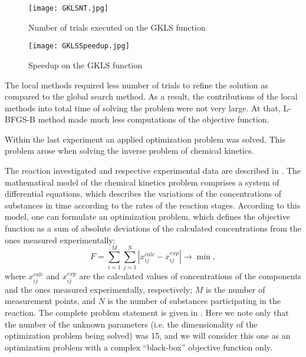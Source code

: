 \documentclass[runningheads]{llncs}
\begin{document}


\begin{figure}
\begin{center}
  \texttt{[image: GKLSNT.jpg]}
  \caption{Number of trials executed on the GKLS function}
  \label{fig:GKLSNT}  
\end{center}
\end{figure}

\begin{figure}
\begin{center}
  \texttt{[image: GKLSSpeedup.jpg]}
  \caption{Speedup on the GKLS function}
  \label{fig:GKLSSpeedup}  
\end{center}
\end{figure}


The local methods required less number of trials to refine the solution as compared to the global search method. As a result, the contributions of the local methods into total time of solving the problem were not very large. At that, L-BFGS-B method made much less computations of the objective function.

Within the last experiment an applied optimization problem was solved. This problem arose when solving the inverse problem of chemical kinetics.

The reaction investigated and respective experimental data are described in \cite{Uskov2020}. The mathematical model of the chemical kinetics problem comprises a system of differential equations, which describes the variations of the concentrations of substances in time according to the rates of the reaction stages. According to this model, one can formulate an optimization problem, which defines the objective function as a sum of absolute deviations of the calculated concentrations from the ones measured experimentally:
\[
F = \sum_{i=1}^{M} \sum_{j=1}^{N} \left| x_{ij}^{calc} - x_{ij}^{exp} \right| \rightarrow \min,
\]
where $x_{ij}^{calc}$ and $x_{ij}^{exp}$ are the calculated values of concentrations of the components and the ones measured experimentally, respectively; $M$ is the number of measurement points, and $N$ is the number of substances participating in the reaction. The complete problem statement is given in \cite{Uskov2020}. Here we note only that the number of the unknown parameters (i.e. the dimensionality of the optimization problem being solved) was 15, and we will consider this one as an optimization problem with a complex ``black-box'' objective function only.
\end{document}
